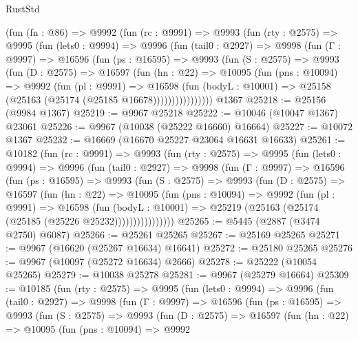 \begin{lexlean}{RustStd}
\begin{coremodule}
    (fun (fn : @86) =>
    @9992
      (fun (rc : @9991) =>
      @9993
        (fun (rty : @2575) =>
        @9995
          (fun (lets0 : @9994) =>
          @9996
            (fun (tail0 : @2927) =>
            @9998
              (fun (Γ : @9997) =>
              @16596
                (fun (ps : @16595) =>
                @9993
                  (fun (S : @2575) =>
                  @9993
                    (fun (D : @2575) =>
                    @16597
                      (fun (hn : @22) =>
                      @10095
                        (fun (pns : @10094) =>
                        @9992
                          (fun (pl : @9991) =>
                          @16598
                            (fun (bodyL : @10001) =>
                            @25158 (@25163 (@25174 (@25185 @16678))))))))))))))))
    @1367
@25218 := @25156 (@9984 @1367)
@25219 := @9967 @25218
@25222 := @10046 (@10047 @1367) @23061
@25226 := @9967 (@10038 (@25222 @16660) @16664)
@25227 := @10072 @1367
@25232 := @16669 (@16670 @25227 @23064 @16631 @16633)
@25261 := @10182
    (fun (rc : @9991) =>
    @9993
      (fun (rty : @2575) =>
      @9995
        (fun (lets0 : @9994) =>
        @9996
          (fun (tail0 : @2927) =>
          @9998
            (fun (Γ : @9997) =>
            @16596
              (fun (ps : @16595) =>
              @9993
                (fun (S : @2575) =>
                @9993
                  (fun (D : @2575) =>
                  @16597
                    (fun (hn : @22) =>
                    @10095
                      (fun (pns : @10094) =>
                      @9992
                        (fun (pl : @9991) =>
                        @16598
                          (fun (bodyL : @10001) =>
                          @25219 (@25163 (@25174 (@25185 (@25226 @25232))))))))))))))))
@25265 := @5445 (@2887 (@3474 @2750) @6087)
@25266 := @25261 @25265
@25267 := @25169 @25265
@25271 := @9967 (@16620 (@25267 @16634) @16641)
@25272 := @25180 @25265
@25276 := @9967 (@10097 (@25272 @16634) @2666)
@25278 := @25222 (@10054 @25265)
@25279 := @10038 @25278
@25281 := @9967 (@25279 @16664)
@25309 := @10185
    (fun (rty : @2575) =>
    @9995
      (fun (lets0 : @9994) =>
      @9996
        (fun (tail0 : @2927) =>
        @9998
          (fun (Γ : @9997) =>
          @16596
            (fun (ps : @16595) =>
            @9993
              (fun (S : @2575) =>
              @9993
                (fun (D : @2575) =>
                @16597
                  (fun (hn : @22) =>
                  @10095
                    (fun (pns : @10094) =>
                    @9992

\end{coremodule}
\end{lexlean}
